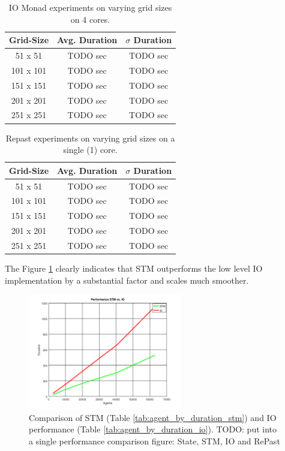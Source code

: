\begin{table}
	\centering
  	\begin{tabular}{ c || c | c }
        Grid-Size & Avg. Duration & $\sigma$ Duration \\ \hline \hline 
   		51 x 51   & TODO sec & TODO sec \\ \hline
   		101 x 101 & TODO sec & TODO sec \\ \hline
   		151 x 151 & TODO sec & TODO sec \\ \hline
   		201 x 201 & TODO sec & TODO sec \\ \hline 
   		251 x 251 & TODO sec & TODO sec \\ \hline 
  	\end{tabular}
  	
  	\caption{IO Monad experiments on varying grid sizes on 4 cores.}
	\label{tab:varyinggrid_constcores_IO}
\end{table}

\begin{table}
	\centering
  	\begin{tabular}{ c || c | c }
        Grid-Size & Avg. Duration & $\sigma$ Duration \\ \hline \hline 
   		51 x 51   & TODO sec & TODO sec \\ \hline
   		101 x 101 & TODO sec & TODO sec \\ \hline
   		151 x 151 & TODO sec & TODO sec \\ \hline
   		201 x 201 & TODO sec & TODO sec \\ \hline 
   		251 x 251 & TODO sec & TODO sec \\ \hline 
  	\end{tabular}
  	
  	\caption{Repast experiments on varying grid sizes on a single (1) core.}
	\label{tab:varyinggrid_constcores_repast}
\end{table}

The Figure \ref{fig:agent_by_duration} clearly indicates that STM outperforms the low level IO implementation by a substantial factor and scales much smoother.
\begin{figure}
	\centering
	\includegraphics[width=0.6\textwidth, angle=0]{./fig/agents_duration_stm_io.png}
	\caption{Comparison of STM (Table \ref{tab:agent_by_duration_stm}) and IO performance (Table \ref{tab:agent_by_duration_io}). TODO: put into a single performance comparison figure: State, STM, IO and RePast}
	\label{fig:agent_by_duration}
\end{figure}

